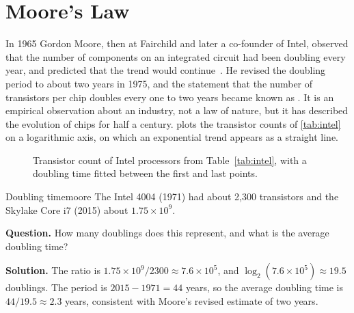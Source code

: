 \section{Moore's Law}\label{sec:moore}
In 1965 Gordon Moore, then at Fairchild and later a co-founder of Intel, observed that the number of components on an integrated circuit had been doubling every year, and predicted that the trend would continue~\cite{moore1965}. He revised the doubling period to about two years in 1975, and the statement that the number of transistors per chip doubles every one to two years became known as . It is an empirical observation about an industry, not a law of nature, but it has described the evolution of chips for half a century.  plots the transistor counts of \cref{tab:intel} on a logarithmic axis, on which an exponential trend appears as a straight line.

\begin{figure}[htbp]
\centering
{}
\caption{Transistor count of Intel processors from Table~\ref{tab:intel}, with a doubling time fitted between the first and last points.}
\label{fig:moore}
\end{figure}

\begin{example}{Doubling time}{moore}
The Intel 4004 (1971) had about 2{,}300 transistors and the Skylake Core i7 (2015) about $1.75\times10^{9}$.

\textbf{Question.} How many doublings does this represent, and what is the average doubling time?

\textbf{Solution.} The ratio is $1.75\times10^{9}/2300 \approx 7.6\times10^{5}$, and $\log_2(7.6\times10^{5}) \approx 19.5$ doublings. The period is $2015-1971 = 44$ years, so the average doubling time is $44/19.5 \approx 2.3$ years, consistent with Moore's revised estimate of two years.
\end{example}

